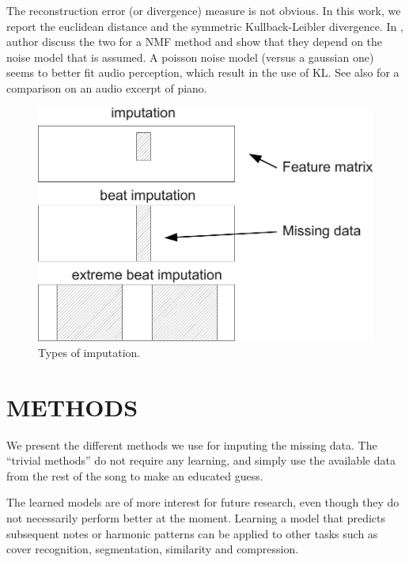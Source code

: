 \documentclass{article}
\begin{document}
The reconstruction error (or divergence) measure is not obvious. In this work,
we report the euclidean distance and the symmetric Kullback-Leibler divergence.
In \cite{Sajda2003}, author discuss the two for
a NMF method and show that they depend on the noise model that is assumed.
A poisson noise model (versus a gaussian one) seems to better fit audio perception, 
which result in the use of KL. See also \cite{Fevotte2009} for a comparison on an
audio excerpt of piano.

\begin{figure}[t]
\begin{center}
\includegraphics[width=.9\columnwidth]{type_imputation}
\end{center}
\caption{Types of imputation.}
\label{fig:typeimputation}
\end{figure}

\section{METHODS}
\label{sec:methods}
We present the different methods we use for imputing the missing data.
The ``trivial methods'' do not require any learning, and simply use the available
data from the rest of the song to make an educated guess.

The learned models are of more interest for future research, even though they do not
necessarily perform better at the moment. Learning a model that predicts subsequent
notes or harmonic patterns can be applied to other tasks such as cover recognition,
segmentation, similarity and compression.
\end{document}
